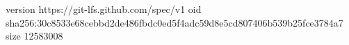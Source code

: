 version https://git-lfs.github.com/spec/v1
oid sha256:30c8533e68cebbd2de486fbdc0ed5f4adc59d8e5cd807406b539b25fce3784a7
size 12583008
